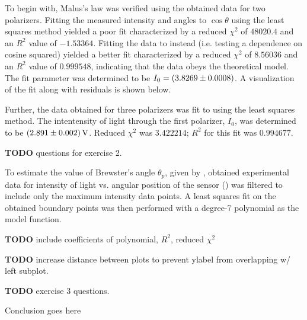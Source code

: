 \begin{paper}
	To begin with, Malus's law was verified using the obtained data for two polarizers. Fitting the measured intensity and angles to \( \cos \theta \) using the least squares method yielded a poor fit characterized by a reduced \( \chi ^ 2 \) of \( 48020.4 \) and an \( R^2 \) value of \( -1.53364 \). Fitting the data to \eqMalusLaw instead (i.e. testing a dependence on cosine squared) yielded a better fit characterized by a reduced \( \chi ^ 2 \)	of \( 8.56036 \) and an \( R ^ 2 \) value of \( 0.999548 \), indicating that the data obeys the theoretical model. The fit parameter was determined to be \( I_0 = \left(3.8269 \pm 0.0008\right) \). A visualization of the fit along with residuals is shown below.
	
	Further, the data obtained for three polarizers was fit to \eqThreePolarizers using the least squares method. The intentensity of light through the first polarizer, \( I_0 \), was determined to be \( \left(2.891 \pm 0.002\right) \si{\volt} \). Reduced \( \chi^2 \) was \( 3.422214 \); \( R^2 \) for this fit was \( 0.994677 \).
	
	\textbf{TODO} questions for exercise 2.
	
	To estimate the value of Brewster's angle \( \theta_p \), given by \eqPolarizingAngle, obtained experimental data for intensity of light vs. angular position of the sensor (\figExerciseThreeData) was filtered to include only the maximum intensity data points. A least squares fit on the obtained boundary points was then performed with a degree-7 polynomial as the model function. 
	
	\textbf{TODO} include coefficients of polynomial, \( R^2 \), reduced \( \chi^2 \)
	
	
	\textbf{TODO} increase distance between plots to prevent ylabel from overlapping w/ left subplot.
	
	\textbf{TODO} exercise 3 questions.
	
	
	

	Conclusion goes here
	


\end{paper}

